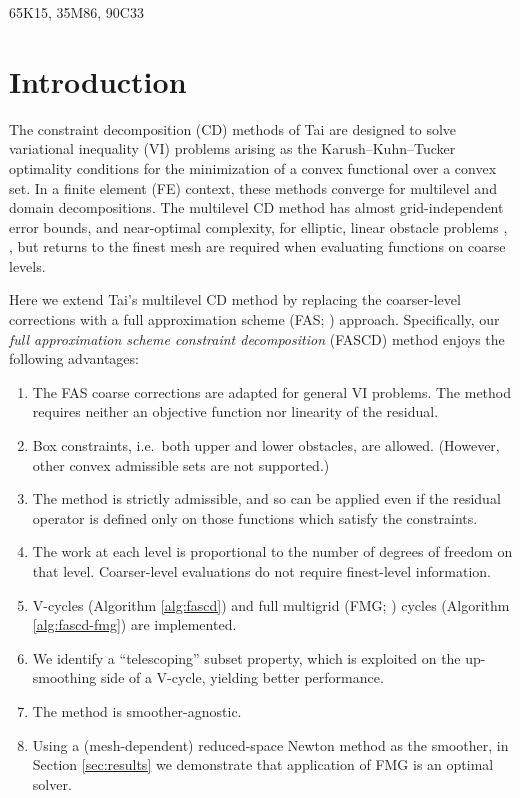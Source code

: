 \documentclass[review,hidelinks,onefignum,onetabnum,final]{siamart220329}  %
\begin{document}
\begin{MSCcodes}
65K15, 35M86, 90C33
\end{MSCcodes}


\section{Introduction} \label{sec:intro}

The constraint decomposition (CD) methods of Tai \cite{Tai2003} are designed to solve variational inequality (VI) problems arising as the Karush--Kuhn--Tucker optimality conditions for the minimization of a convex functional over a convex set.  In a finite element (FE) context, these methods converge for multilevel and domain decompositions.  The multilevel CD method has almost grid-independent error bounds, and near-optimal complexity, for elliptic, linear obstacle problems \cite[Subsection 5.4]{Tai2003}, \cite[Theorem 4.6]{GraeserKornhuber2009}, but returns to the finest mesh are required when evaluating functions on coarse levels.

Here we extend Tai's multilevel CD method by replacing the coarser-level corrections with a full approximation scheme (FAS; \cite{Brandt1977,Bruneetal2015}) approach.  Specifically, our \emph{full approximation scheme constraint decomposition} (FASCD) method enjoys the following advantages:
\renewcommand{\labelenumi}{\emph{(\roman{enumi})}}
\begin{enumerate}
\item The FAS coarse corrections are adapted for general VI problems. The method requires neither an objective function nor linearity of the residual.
\item Box constraints, i.e.~both upper and lower obstacles, are allowed.  (However, other convex admissible sets are not supported.)
\item The method is strictly admissible, and so can be applied even if the residual operator is defined only on those functions which satisfy the constraints.
\item The work at each level is proportional to the number of degrees of freedom on that level. Coarser-level evaluations do not require finest-level information.
\item V-cycles (Algorithm \ref{alg:fascd}) and full multigrid (FMG; \cite{Trottenbergetal2001}) cycles (Algorithm \ref{alg:fascd-fmg}) are implemented.
\item We identify a ``telescoping'' subset property, which is exploited on the up-smoothing side of a V-cycle, yielding better performance.
\item The method is smoother-agnostic.
\item Using a (mesh-dependent) reduced-space Newton method \cite{BensonMunson2006} as the smoother, in Section \ref{sec:results} we demonstrate that application of FMG is an optimal solver.
\end{enumerate}
\end{document}
